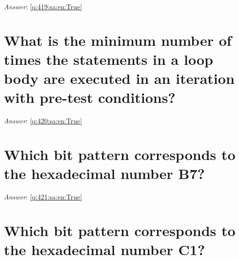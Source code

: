 \documentclass[a4paper,11pt,oneside]{book}
\begin{document}
\begin{sloppypar}
\label{q:419:sa:en:False}

\vspace{2cm}

\noindent\makebox[\textwidth]{\hrulefill}

\vspace{1cm}

\textit{Answer}: \autoref{q:419:sa:en:True}



\section{What is the minimum number of times the statements in a loop body are executed in an iteration with pre-test conditions?}

\label{q:420:sa:en:False}

\vspace{2cm}

\noindent\makebox[\textwidth]{\hrulefill}

\vspace{1cm}

\textit{Answer}: \autoref{q:420:sa:en:True}



\section{Which bit pattern corresponds to the hexadecimal number B7?}

\label{q:421:sa:en:False}

\vspace{2cm}

\noindent\makebox[\textwidth]{\hrulefill}

\vspace{1cm}

\textit{Answer}: \autoref{q:421:sa:en:True}



\section{Which bit pattern corresponds to the hexadecimal number C1?}

\label{q:422:sa:en:False}

\vspace{2cm}

\noindent\makebox[\textwidth]{\hrulefill}

\vspace{1cm}


\end{sloppypar}
\end{document}
